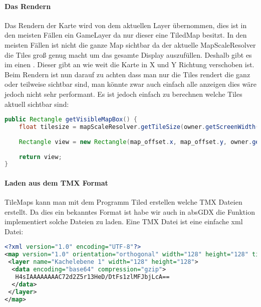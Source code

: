 
\paragraph{Das Rendern}

Das Rendern der Karte wird von dem aktuellen Layer übernommen, dies ist in den meisten Fällen ein GameLayer da nur dieser eine TiledMap besitzt.
In den meisten Fällen ist nicht die ganze Map sichtbar da der aktuelle MapScaleResolver die Tiles groß genug macht um das gesamte Display auszufüllen. Deshalb gibt es im  einen . Dieser gibt an wie weit die Karte in X und Y Richtung verschoben ist.
Beim Rendern ist nun darauf zu achten dass man nur die Tiles rendert die ganz oder teilweise sichtbar sind, man könnte zwar auch einfach alle anzeigen dies wäre jedoch nicht sehr performant. Es ist jedoch einfach zu berechnen welche Tiles aktuell sichtbar sind:\cite[S 232f.]{DGIJ}

\doinline
\begin{lstlisting}[caption=Ermitteln der aktuell sichtbare Tiles, title=\hspace{0 pt}, language=java]
public Rectangle getVisibleMapBox() {
	float tilesize = mapScaleResolver.getTileSize(owner.getScreenWidth(), owner.getScreenHeight(), map.height, map.width);
	
	Rectangle view = new Rectangle(map_offset.x, map_offset.y, owner.getScreenWidth() / tilesize, owner.getScreenHeight() / tilesize);
	
	return view;
}
\end{lstlisting}

\paragraph{Laden aus dem TMX Format}

TileMaps kann man mit dem Programm Tiled erstellen \cite{TILED} welche TMX Dateien erstellt. Da dies ein bekanntes Format ist habe wir auch in absGDX die Funktion implementiert solche Dateien zu laden. Eine TMX Datei ist eine einfache xml Datei:

\doinline
\begin{lstlisting}[caption=Beipiel einer TMX Datei, title=\hspace{0 pt}, language=xml]
<?xml version="1.0" encoding="UTF-8"?>
<map version="1.0" orientation="orthogonal" width="128" height="128" tilewidth="16" tileheight="16">
 <layer name="Kachelebene 1" width="128" height="128">
  <data encoding="base64" compression="gzip">
   H4sIAAAAAAAAC72d2Z5r13HeD/DtFs1zlMFJbjLcA==
  </data>
 </layer>
</map>
\end{lstlisting}

